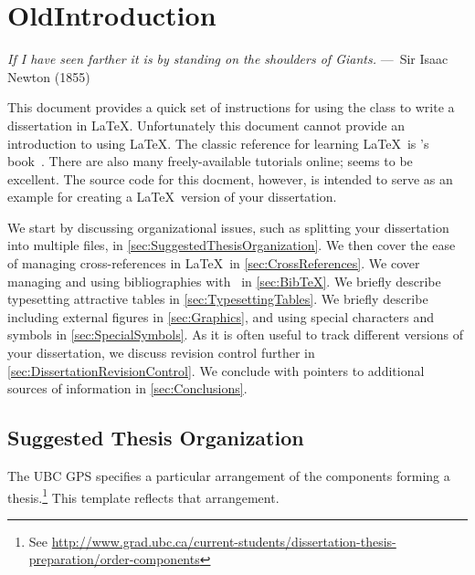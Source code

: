 
\chapter{OldIntroduction}
\label{ch:OldIntroduction}

\begin{epigraph}
	\emph{If I have seen farther it is by standing on the shoulders of
		Giants.} ---~Sir Isaac Newton (1855)
\end{epigraph}

This document provides a quick set of instructions for using the
 class to write a dissertation in \LaTeX. 
Unfortunately this document cannot provide an introduction to using
\LaTeX.  The classic reference for learning \LaTeX\ is
\citeauthor{lamport-1994-ladps}'s
book~\cite{lamport-1994-ladps}.  There are also many freely-available
tutorials online;
seems to be excellent.
The source code for this docment, however, is intended to serve as
an example for creating a \LaTeX\ version of your dissertation.

We start by discussing organizational issues, such as splitting
your dissertation into multiple files, in
\autoref{sec:SuggestedThesisOrganization}.
We then cover the ease of managing cross-references in \LaTeX\ in
\autoref{sec:CrossReferences}.
We cover managing and using bibliographies with \BibTeX\ in
\autoref{sec:BibTeX}. 
We briefly describe typesetting attractive tables in
\autoref{sec:TypesettingTables}.
We briefly describe including external figures in
\autoref{sec:Graphics}, and using special characters and symbols
in \autoref{sec:SpecialSymbols}.
As it is often useful to track different versions of your dissertation,
we discuss revision control further in
\autoref{sec:DissertationRevisionControl}. 
We conclude with pointers to additional sources of information in
\autoref{sec:Conclusions}.

\section{Suggested Thesis Organization}
\label{sec:SuggestedThesisOrganization}

The \acs{UBC} \acf{GPS} specifies a particular arrangement of the
components forming a thesis.\footnote{See
	\url{http://www.grad.ubc.ca/current-students/dissertation-thesis-preparation/order-components}}
This template reflects that arrangement.

